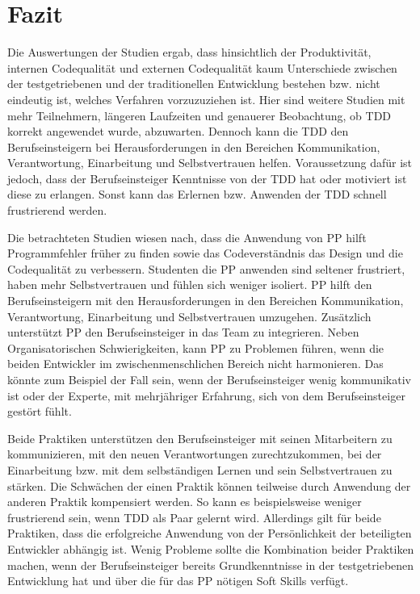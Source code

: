 \section{Fazit} \label{sec:ende}

Die Auswertungen der Studien ergab, dass hinsichtlich der Produktivität, internen Codequalität und externen Codequalität kaum Unterschiede zwischen der testgetriebenen und der traditionellen Entwicklung bestehen bzw. nicht eindeutig ist, welches Verfahren vorzuzuziehen ist. Hier sind weitere Studien mit mehr Teilnehmern, längeren Laufzeiten und genauerer Beobachtung, ob TDD korrekt angewendet wurde, abzuwarten. Dennoch kann die TDD den Berufseinsteigern bei Herausforderungen in den Bereichen Kommunikation, Verantwortung, Einarbeitung und Selbstvertrauen helfen. Voraussetzung dafür ist jedoch, dass der Berufseinsteiger Kenntnisse von der TDD hat oder motiviert ist diese zu erlangen. Sonst kann das Erlernen bzw. Anwenden der TDD schnell frustrierend werden.

Die betrachteten Studien wiesen nach, dass die Anwendung von PP hilft Programmfehler früher zu finden sowie das Codeverständnis das Design und die Codequalität zu verbessern. Studenten die PP anwenden sind seltener frustriert, haben mehr Selbstvertrauen und fühlen sich weniger isoliert. PP hilft den Berufseinsteigern mit den Herausforderungen in den Bereichen Kommunikation, Verantwortung, Einarbeitung und Selbstvertrauen umzugehen. Zusätzlich unterstützt PP den Berufseinsteiger in das Team zu integrieren. Neben Organisatorischen Schwierigkeiten, kann PP zu Problemen führen, wenn die beiden Entwickler im zwischenmenschlichen Bereich nicht harmonieren. Das könnte zum Beispiel der Fall sein, wenn der Berufseinsteiger wenig kommunikativ ist oder der Experte, mit mehrjähriger Erfahrung, sich von dem Berufseinsteiger gestört fühlt.

Beide Praktiken unterstützen den Berufseinsteiger mit seinen Mitarbeitern zu kommunizieren, mit den neuen Verantwortungen zurechtzukommen, bei der Einarbeitung bzw. mit dem selbständigen Lernen und sein Selbstvertrauen zu stärken. Die Schwächen der einen Praktik können teilweise durch Anwendung der anderen Praktik kompensiert werden. So kann es beispielsweise weniger frustrierend sein, wenn TDD als Paar gelernt wird. Allerdings gilt für beide Praktiken, dass die erfolgreiche Anwendung von der Persönlichkeit der beteiligten Entwickler abhängig ist. Wenig Probleme sollte die Kombination beider Praktiken machen, wenn der Berufseinsteiger bereits Grundkenntnisse in der testgetriebenen Entwicklung hat und über die für das PP nötigen Soft Skills verfügt.


